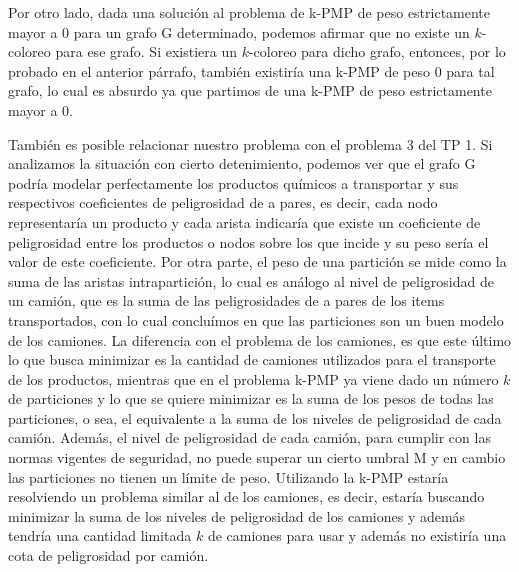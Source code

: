 Por otro lado, dada una solución al problema de k-PMP de peso estrictamente mayor a $0$ para un grafo G determinado, podemos afirmar que no existe un $k$-coloreo para ese grafo. Si existiera un $k$-coloreo para dicho grafo, entonces, por lo probado en el anterior párrafo, también existiría una k-PMP de peso $0$ para tal grafo, lo cual es absurdo ya que partimos de una k-PMP de peso estrictamente mayor a $0$.

También es posible relacionar nuestro problema con el problema 3 del TP 1. Si analizamos la situación con cierto detenimiento, podemos ver que el grafo G podría modelar perfectamente los productos químicos a transportar y sus respectivos coeficientes de peligrosidad de a pares, es decir, cada nodo representaría un producto y cada arista indicaría que existe un coeficiente de peligrosidad entre los productos o nodos sobre los que incide y su peso sería el valor de este coeficiente. Por otra parte, el peso de una partición se mide como la suma de las aristas intrapartición, lo cual es análogo al nivel de peligrosidad de un camión, que es la suma de las peligrosidades de a pares de los items transportados, con lo cual concluímos en que las particiones son un buen modelo de los camiones. La diferencia con el problema de los camiones, es que este último lo que busca minimizar es la cantidad de camiones utilizados para el transporte de los productos, mientras que en el problema k-PMP ya viene dado un número $k$ de particiones y lo que se quiere minimizar es la suma de los pesos de todas las particiones, o sea, el equivalente a la suma de los niveles de peligrosidad de cada camión. Además, el nivel de peligrosidad de cada camión, para cumplir con las normas vigentes de seguridad, no puede superar un cierto umbral M y en cambio las particiones no tienen un límite de peso. Utilizando la k-PMP estaría resolviendo un problema similar al de los camiones, es decir, estaría buscando minimizar la suma de los niveles de peligrosidad de los camiones y además tendría una cantidad limitada $k$ de camiones para usar y además no existiría una cota de peligrosidad por camión.